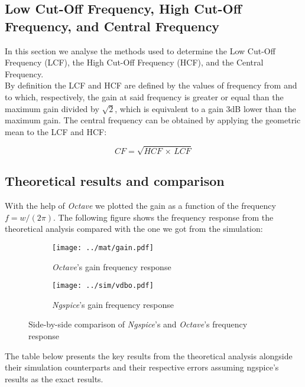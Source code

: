 \subsection{Low Cut-Off Frequency, High Cut-Off Frequency, and Central Frequency}
In this section we analyse the methods used to determine the Low Cut-Off Frequency (LCF), the High Cut-Off Frequency (HCF), and the Central Frequency.\\
By definition the LCF and HCF are defined by the values of frequency from and to which, respectively, the gain at said frequency is greater or equal than the maximum gain divided by $\sqrt{2}$, which is equivalent to a gain 3dB lower than the maximum gain.
The central frequency can be obtained by applying the geometric mean to the LCF and HCF:


\begin{equation}
    CF=\sqrt{HCF\, \times \, LCF}
    \label{Eq:freq_cental}
\end{equation}

\subsection{Theoretical results and comparison}

With the help of \textit{Octave} we plotted the gain as a function of the frequency $f=w/(2\pi)$. The following figure shows the frequency response from the theoretical analysis compared with the one we got from the simulation:


\begin{figure}[h]
    \centering
    \begin{subfigure}{.5\textwidth}
        \centering
        \texttt{[image: ../mat/gain.pdf]}
        \caption{\textit{Octave}'s gain frequency response}
        \label{fig:Ngspicegain(f)}
    \end{subfigure}%
    \begin{subfigure}{.5\textwidth}
        \centering
        \texttt{[image: ../sim/vdbo.pdf]}
        \caption{\textit{Ngspice}'s gain frequency response}
        \label{fig:Ngspicegain(f)}
    \end{subfigure}
    \caption{Side-by-side comparison of \textit{Ngspice}'s and \textit{Octave}'s frequency response}
    \label{fig:Gaincomparison}
\end{figure}

The table below presents the key results from the theoretical analysis alongside their simulation counterparts and their respective errors assuming ngspice's results as the exact results.

